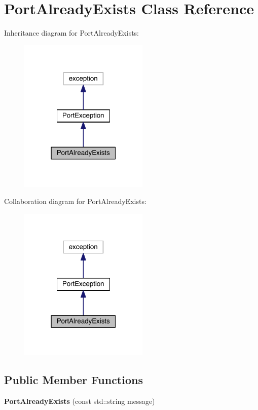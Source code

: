 \hypertarget{class_port_already_exists}{}\section{Port\+Already\+Exists Class Reference}
\label{class_port_already_exists}


Inheritance diagram for Port\+Already\+Exists\+:
\nopagebreak
\begin{figure}[H]
\begin{center}
\leavevmode
\includegraphics[width=175pt]{class_port_already_exists__inherit__graph}
\end{center}
\end{figure}


Collaboration diagram for Port\+Already\+Exists\+:
\nopagebreak
\begin{figure}[H]
\begin{center}
\leavevmode
\includegraphics[width=175pt]{class_port_already_exists__coll__graph}
\end{center}
\end{figure}
\subsection*{Public Member Functions}
\begin{DoxyCompactItemize}
\item 
\hypertarget{class_port_already_exists_a50454163ba6c3315685b4f82f54df6d3}{}\label{class_port_already_exists_a50454163ba6c3315685b4f82f54df6d3} 
{\bfseries Port\+Already\+Exists} (const std\+::string message)
\end{DoxyCompactItemize}


